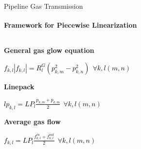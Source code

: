 \documentclass[aspectratio=169]{beamer}
\begin{document}
\begin{frame}{Pipeline Gas Transmission}
    \framesubtitle{Framework for Piecewise Linearization}

    \vspace{-.9cm}
    \begin{columns}
        \begin{column}{.39\textwidth}
            \begin{coloredblock}[yellow][][][c][3.5cm]
                \begin{center}
                    \textbf{General gas glow equation}
                    \vspace{.5cm}\par
                    \footnotesize\textcolor{black}{$f_{k,l}|f_{k,l}|=R_l^G(p_{k,m}^2-p_{k,n}^2)~~\forall k,l(m,n)$}
                \end{center}
            \end{coloredblock}

            \begin{coloredblock}[yellow][][][c][3.5cm]
                \begin{center}
                    \textbf{Linepack}
                    \vspace{.5cm}\par
                    \footnotesize\textcolor{black}{$lp_{k,l}=LP_l\frac{p_{k,m}+p_{k,m}}{2}~~\forall k,l(m,n)$}
                \end{center}
            \end{coloredblock}

            \begin{coloredblock}[yellow][][][c][3.5cm]
                \begin{center}
                    \textbf{Average gas flow}
                    \vspace{.5cm}\par
                    \footnotesize\textcolor{black}{$f_{k,l}=LP_l\frac{f_{k,l}^{in}+f_{k,l}^{out}}{2}~~\forall k,l(m,n)$}
                \end{center}
            \end{coloredblock}


\end{column}
\end{columns}
\end{frame}
\end{document}
